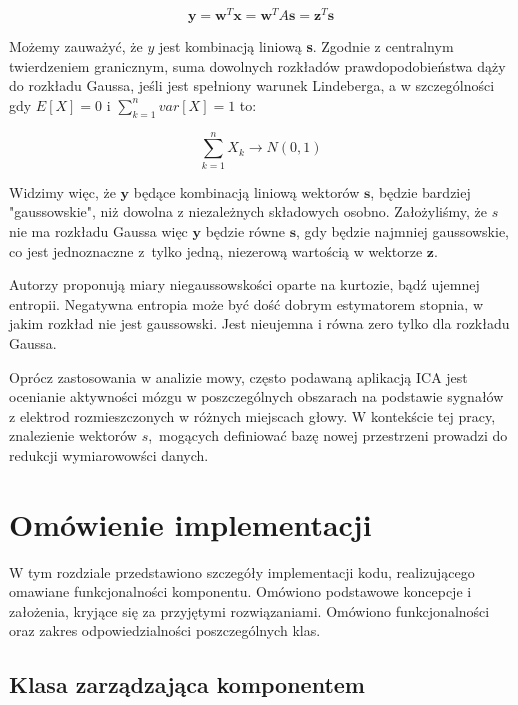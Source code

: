 \documentclass[oneside, eng]{mgr}
\newcommand{\bb}{\textbf}
\begin{document}
\begin{equation}
	\bb{y} = \bb{w}^T \bb{x} = \bb{w}^T A \bb{s} = \bb{z}^T \bb{s} 
\end{equation}

Możemy zauważyć, że $y$ jest kombinacją liniową \bb{s}. Zgodnie z centralnym twierdzeniem granicznym, suma dowolnych rozkładów prawdopodobieństwa dąży do rozkładu Gaussa, jeśli jest spełniony warunek Lindeberga, a w szczególności gdy $E[X] = 0$ i $\sum_{k=1}^{n}var[X] = 1$ to:

\begin{equation}
	\sum_{k=1}^{n} X_k \to N(0,1)
\end{equation}

Widzimy więc, że $\bb{y}$ będące kombinacją liniową wektorów $\bb{s}$, będzie bardziej "gaussowskie", niż dowolna z niezależnych składowych osobno. Założyliśmy, że $s$ nie ma rozkładu Gaussa więc $\bb{y}$ będzie równe $\bb{s}$, gdy będzie najmniej gaussowskie, co jest jednoznaczne z~tylko jedną, niezerową wartością w wektorze $\bb{z}$.

Autorzy \cite{ICA} proponują miary niegaussowskości oparte na kurtozie, bądź ujemnej entropii. Negatywna entropia może być dość dobrym estymatorem stopnia, w jakim rozkład nie jest gaussowski. Jest nieujemna i równa zero tylko dla rozkładu Gaussa.


Oprócz zastosowania w analizie mowy, często podawaną aplikacją ICA jest ocenianie aktywności mózgu w poszczególnych obszarach na podstawie sygnałów z elektrod rozmieszczonych w różnych miejscach głowy. W kontekście tej pracy, znalezienie wektorów $s$,~mogących definiować bazę nowej przestrzeni prowadzi do redukcji wymiarowowści danych.

\newpage


\chapter{Omówienie implementacji}

W tym rozdziale przedstawiono szczegóły implementacji kodu, realizującego omawiane funkcjonalności komponentu. Omówiono podstawowe koncepcje i założenia, kryjące się za przyjętymi rozwiązaniami. Omówiono funkcjonalności oraz zakres odpowiedzialności poszczególnych klas.

\section{Klasa zarządzająca komponentem}
\end{document}
